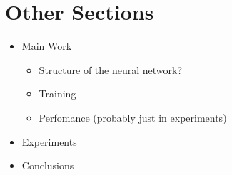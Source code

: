 \documentclass[a4paper]{article}
\begin{document}



\section{Other Sections}
\begin{itemize}
  \item Main Work
        \begin{itemize}
          \item Structure of the neural network?
          \item Training
          \item Perfomance (probably just in experiments)
        \end{itemize}
  \item Experiments
  \item Conclusions
\end{itemize}
\end{document}
